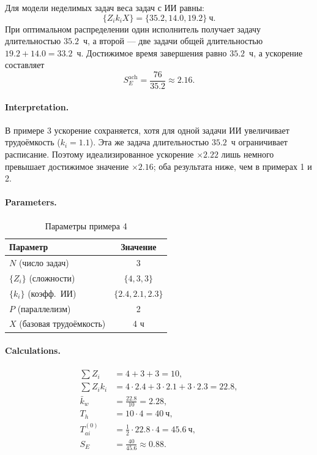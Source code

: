 \documentclass[12pt,a4paper]{article}
\theoremstyle{definition}
\begin{document}
Для модели неделимых задач веса задач с ИИ равны:
\[
  \{Z_i k_i X\} = \{35.2, 14.0, 19.2\}~\text{ч}.
\]
При оптимальном распределении один исполнитель получает задачу длительностью $35.2$~ч, а второй --- две задачи общей длительностью $19.2 + 14.0 = 33.2$~ч. Достижимое время завершения равно $35.2$~ч, а ускорение составляет
\[
  S_E^{\text{ach}} = \frac{76}{35.2} \approx 2.16.
\]

\paragraph{Interpretation.}
В примере 3 ускорение сохраняется, хотя для одной задачи ИИ увеличивает трудоёмкость ($k_i = 1.1$). Эта же задача длительностью $35.2$~ч ограничивает расписание. Поэтому идеализированное ускорение $\times 2.22$ лишь немного превышает достижимое значение $\times 2.16$; оба результата ниже, чем в примерах 1 и 2.


\paragraph{Parameters.}
\begin{table}[ht!]
\centering
\caption{Параметры примера 4}
\label{tab:example-4-params}
\begin{tabular}{lc}
\toprule
Параметр & Значение \\
\midrule
$N$ (число задач) & 3 \\
$\{Z_i\}$ (сложности) & $\{4, 3, 3\}$ \\
$\{k_i\}$ (коэфф.\ ИИ) & $\{2.4, 2.1, 2.3\}$ \\
$P$ (параллелизм) & 2 \\
$X$ (базовая трудоёмкость) & 4 ч \\
\bottomrule
\end{tabular}
\end{table}

\paragraph{Calculations.}
\begin{align*}
  \sum Z_i &= 4 + 3 + 3 = 10, \\
  \sum Z_i k_i &= 4{\cdot}2.4 + 3{\cdot}2.1 + 3{\cdot}2.3 = 22.8, \\
  \bar{k}_w &= \frac{22.8}{10} = 2.28, \\
  T_h &= 10 \cdot 4 = 40~\text{ч}, \\
  T_{ai}^{(0)} &= \frac{1}{2} \cdot 22.8 \cdot 4 = 45.6~\text{ч}, \\
  S_E &= \frac{40}{45.6} \approx 0.88.
\end{align*}
\end{document}
